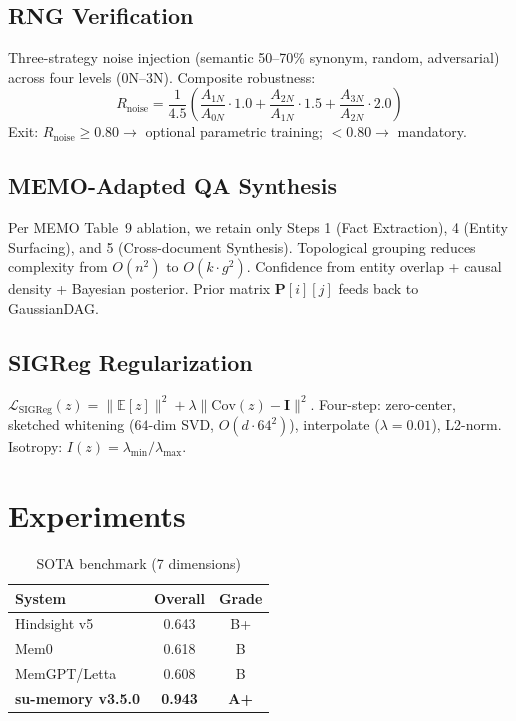 \documentclass[10pt,twocolumn]{article}
\begin{document}
\subsection{RNG Verification}

Three-strategy noise injection (semantic 50--70\% synonym, random, adversarial) across four levels (0N--3N). Composite robustness:
\[
R_{\text{noise}}=\frac{1}{4.5}\!\left(\frac{A_{1N}}{A_{0N}}\!\cdot\!1.0+\frac{A_{2N}}{A_{1N}}\!\cdot\!1.5+\frac{A_{3N}}{A_{2N}}\!\cdot\!2.0\right)
\]
Exit: $R_{\text{noise}}\ge0.80\to$ optional parametric training; $<0.80\to$ mandatory.

\subsection{MEMO-Adapted QA Synthesis}

Per MEMO Table~9 ablation, we retain only Steps 1 (Fact Extraction), 4 (Entity Surfacing), and 5 (Cross-document Synthesis). Topological grouping reduces complexity from $O(n^2)$ to $O(k\cdot g^2)$. Confidence from entity overlap + causal density + Bayesian posterior. Prior matrix $\mathbf{P}[i][j]$ feeds back to GaussianDAG.

\subsection{SIGReg Regularization}

$\mathcal{L}_{\text{SIGReg}}(z)=\|\mathbb{E}[z]\|^2+\lambda\|\text{Cov}(z)-\mathbf{I}\|^2$. Four-step: zero-center, sketched whitening ($64$-dim SVD, $O(d\cdot64^2)$), interpolate ($\lambda=0.01$), L2-norm. Isotropy: $I(z)=\lambda_{\min}/\lambda_{\max}$.

\section{Experiments}

\begin{table}[H]
\centering\small\caption{SOTA benchmark (7 dimensions)}
\begin{tabular}{lcc}
\toprule
System & Overall & Grade \\
\midrule
Hindsight v5  & 0.643 & B+ \\
Mem0          & 0.618 & B  \\
MemGPT/Letta  & 0.608 & B  \\
\textbf{su-memory v3.5.0} & \textbf{0.943} & \textbf{A+} \\
\bottomrule
\end{tabular}
\end{table}
\end{document}
